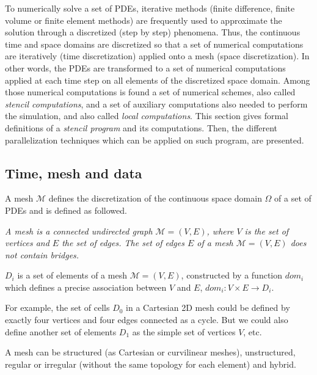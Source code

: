 To numerically solve a set of PDEs, iterative methods (finite difference, finite volume or finite element methods) are frequently used to approximate the solution through a discretized (step by step) phenomena. Thus, the continuous time and space domains are discretized so that a set of numerical computations are iteratively (time discretization) applied onto a mesh (space discretization). In other words, the PDEs are transformed to a set of numerical computations applied at each time step on all elements of the discretized space domain. Among those numerical computations is found a set of numerical schemes, also called \textit{stencil computations}, and a set of auxiliary computations also needed to perform the simulation, and also called \emph{local computations}.
This section gives formal definitions of a \textit{stencil program} and its computations. Then, the different parallelization techniques which can be applied on such program, are presented.

\subsection{Time, mesh and data}

A mesh $\mathcal{M}$ defines the discretization of the continuous space domain $\Omega$ of a set of PDEs and is defined as followed. 

\begin{mydef}
\textit{A mesh is a connected undirected graph $\mathcal{M}=(V,E)$, where $V$ is the set of vertices and $E$ the set of edges. The set of edges $E$ of a mesh $\mathcal{M}=(V,E)$ does not contain bridges.}
\end{mydef}

\begin{mydef}
$D_i$ is a set of elements of a mesh $\mathcal{M}=(V,E)$, constructed by a function $dom_i$ which defines a precise association between $V$ and $E$, $dom_i : V \times E \rightarrow D_i$.
\end{mydef}
For example, the set of cells $D_0$ in a Cartesian 2D mesh could be defined by exactly four vertices and four edges connected as a cycle. But we could also define another set of elements $D_1$ as the simple set of vertices $V$, etc.

A mesh can be structured (as Cartesian or curvilinear meshes), unstructured, regular or irregular (without the same topology for each element) and hybrid. 

